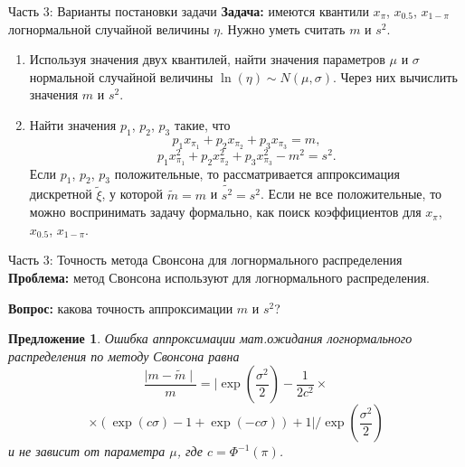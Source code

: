 \documentclass[ucs, notheorems, handout]{beamer}
\newtheorem{proposition2}[theorem]{Предложение}
\begin{document}
\begin{frame}{Часть 3: Варианты постановки задачи}
	\textbf{Задача:} имеются квантили $x_{\pi}$, $x_{0.5}$, $x_{1-\pi}$ логнормальной случайной величины $\eta$. Нужно уметь считать $m$ и $s^{2}$.
	
	\begin{enumerate}
		\item Используя значения двух квантилей, найти значения параметров $\mu$ и $\sigma$ нормальной случайной величины $\ln(\eta)\sim N(\mu, \sigma)$. Через них вычислить значения $m$ и $s^{2}$.
		\item Найти значения $p_{1}$, $p_{2}$, $p_{3}$ такие, что 
		\begin{equation*}
			p_{1}x_{\pi_{1}} + p_{2}x_{\pi_{2}} + p_{3}x_{\pi_{3}} = m, \label{2}
		\end{equation*}
		\begin{equation*}
			p_{1} x_{\pi_{1}}^{2} + p_{2} x_{\pi_{2}}^{2} + p_{3} x_{\pi_{3}}^{2} - m^{2} = s^{2}.
		\end{equation*}
		Если $p_{1}$, $p_{2}$, $p_{3}$ положительные, то рассматривается аппроксимация дискретной $\tilde{\xi}$, у которой $\tilde{m} = m$ и $\tilde{s^{2}}=s^{2}$.
		Если не все положительные, то можно воспринимать задачу формально, как поиск коэффициентов для $x_{\pi}$, $x_{0.5}$, $x_{1-\pi}$. 
	\end{enumerate}
\end{frame}

\begin{frame}{Часть 3: Точность метода Свонсона для логнормального распределения}
	\textbf{Проблема:} метод Свонсона используют для логнормального распределения.
	
	\textbf{Вопрос:} какова точность аппроксимации $m$ и $s^{2}$?
	
	\begin{proposition2}\label{pr5}
		Ошибка аппроксимации мат.ожидания логнормального распределения по методу Свонсона равна
		\[\dfrac{\mid m - \widetilde{m} \mid}{m} = \biggl| \exp\left( \dfrac{\sigma^{2}}{2}\right)  - \dfrac{1}{2 c^{2}}\times\]\[\times(\exp(c\sigma)-1 +\exp(-c\sigma)) + 1 \biggr|/\exp\left(\dfrac{\sigma^{2}}{2}\right)\]
		и не зависит от параметра $\mu$, где $c = \Phi^{-1}(\pi)$.
	\end{proposition2}
\end{frame}
\end{document}
